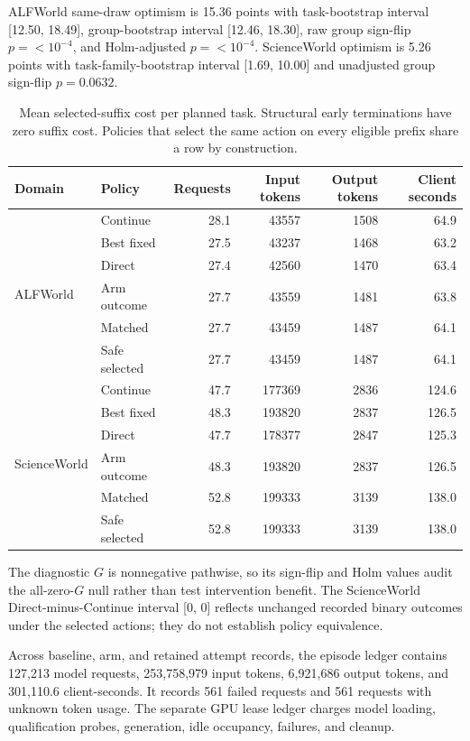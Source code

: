 ALFWorld same-draw optimism is 15.36 points with task-bootstrap interval [12.50, 18.49], group-bootstrap interval [12.46, 18.30], raw group sign-flip $p=<10^{-4}$, and Holm-adjusted $p=<10^{-4}$. ScienceWorld optimism is 5.26 points with task-family-bootstrap interval [1.69, 10.00] and unadjusted group sign-flip $p=0.0632$.

\begin{table}[ht]
\caption{Mean selected-suffix cost per planned task. Structural early terminations have zero suffix cost. Policies that select the same action on every eligible prefix share a row by construction.}
\label{tab:costs}
\centering
\small
\begin{tabular}{@{}llrrrr@{}}
\toprule
Domain & Policy & Requests & Input tokens & Output tokens & Client seconds \\
\midrule
\multirow{6}{*}{ALFWorld} & Continue & 28.1 & 43557 & 1508 & 64.9 \\
 & Best fixed & 27.5 & 43237 & 1468 & 63.2 \\
 & Direct & 27.4 & 42560 & 1470 & 63.4 \\
 & Arm outcome & 27.7 & 43559 & 1481 & 63.8 \\
 & Matched & 27.7 & 43459 & 1487 & 64.1 \\
 & Safe selected & 27.7 & 43459 & 1487 & 64.1 \\
\midrule
\multirow{6}{*}{ScienceWorld} & Continue & 47.7 & 177369 & 2836 & 124.6 \\
 & Best fixed & 48.3 & 193820 & 2837 & 126.5 \\
 & Direct & 47.7 & 178377 & 2847 & 125.3 \\
 & Arm outcome & 48.3 & 193820 & 2837 & 126.5 \\
 & Matched & 52.8 & 199333 & 3139 & 138.0 \\
 & Safe selected & 52.8 & 199333 & 3139 & 138.0 \\
\bottomrule
\end{tabular}
\end{table}

The diagnostic $G$ is nonnegative pathwise, so its sign-flip and Holm values audit the all-zero-$G$ null rather than test intervention benefit. The ScienceWorld Direct-minus-Continue interval [0, 0] reflects unchanged recorded binary outcomes under the selected actions; they do not establish policy equivalence.

Across baseline, arm, and retained attempt records, the episode ledger contains 127,213 model requests, 253,758,979 input tokens, 6,921,686 output tokens, and 301,110.6 client-seconds. It records 561 failed requests and 561 requests with unknown token usage. The separate GPU lease ledger charges model loading, qualification probes, generation, idle occupancy, failures, and cleanup.

